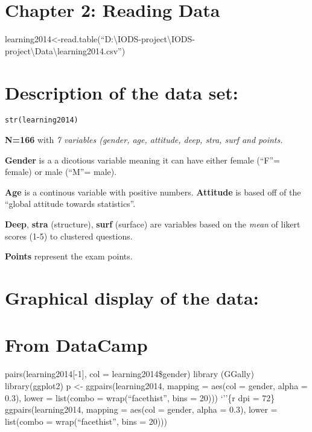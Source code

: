 \documentclass[]{article}
\title{}
\author{}
\date{}
\begin{document}
\section{Chapter 2: Reading Data}\label{chapter-2-reading-data}

learning2014\textless{}-read.table(``D:\textbackslash{}IODS-project\textbackslash{}IODS-project\textbackslash{}Data\textbackslash{}learning2014.csv'')

\section{Description of the data
set:}\label{description-of-the-data-set}

\begin{verbatim}
str(learning2014)
\end{verbatim}

\textbf{N=166} with \emph{7 variables (gender, age, attitude, deep,
stra, surf and points.}

\textbf{Gender} is a a dicotious variable meaning it can have either
female (``F''= female) or male (``M''= male).

\textbf{Age} is a continous variable with positive numbers.
\textbf{Attitude} is based off of the ``global attitude towards
statistics''.

\textbf{Deep}, \textbf{stra} (structure), \textbf{surf} (surface) are
variables based on the \emph{mean} of likert scores (1-5) to clustered
questions.

\textbf{Points} represent the exam points.

\section{Graphical display of the
data:}\label{graphical-display-of-the-data}

\section{From DataCamp}\label{from-datacamp}

pairs(learning2014{[}-1{]}, col = learning2014\$gender) library (GGally)
library(ggplot2) p \textless{}- ggpairs(learning2014, mapping = aes(col
= gender, alpha = 0.3), lower = list(combo = wrap(``facethist'', bins =
20))) `''\{r dpi = 72\} ggpairs(learning2014, mapping = aes(col =
gender, alpha = 0.3), lower = list(combo = wrap(``facethist'', bins =
20)))
\end{document}
